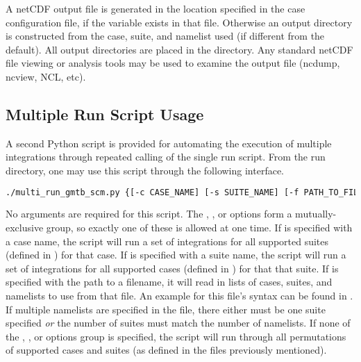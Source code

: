 A netCDF output file is generated in the location specified in the case
configuration file, if the  variable exists in that file. Otherwise an output directory is constructed from the case, suite, and namelist used (if different from the default). All output directories are placed in the  directory. Any standard netCDF file viewing or analysis tools may be used to
examine the output file (ncdump, ncview, NCL, etc).

\subsection{Multiple Run Script Usage}

A second Python script is provided for automating the execution of multiple integrations through repeated calling of the single run script. From the run directory, one may use this script through the following interface.

\begin{lstlisting}[language=bash]
./multi_run_gmtb_scm.py {[-c CASE_NAME] [-s SUITE_NAME] [-f PATH_TO_FILE]} [-v{v}] [-t]
\end{lstlisting}

No arguments are required for this script. The , , or  options form a mutually-exclusive group, so exactly one of these is allowed at one time. If  is specified with a case name, the script will run a set of integrations for all supported suites (defined in ) for that case. If  is specified with a suite name, the script will run a set of integrations for all supported cases (defined in ) for that that suite. If  is specified with the path to a filename, it will read in lists of cases, suites, and namelists to use from that file. An example for this file's syntax can be found in . If multiple namelists are specified in the file, there either must be one suite specified \emph{or} the number of suites must match the number of namelists. If none of the , , or  options group is specified, the script will run through all permutations of supported cases and suites (as defined in the files previously mentioned).

